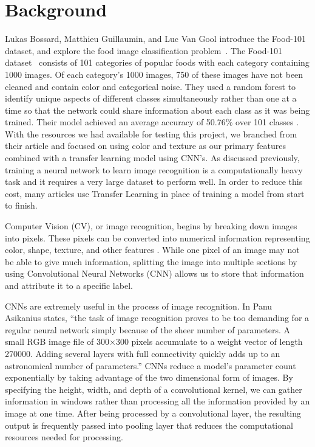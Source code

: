 \documentclass[conference]{IEEEtran}
\begin{document}
\section{Background}

Lukas Bossard, Matthieu Guillaumin, and Luc Van Gool introduce the Food-101 dataset, and explore the food image classification problem~\cite{mainRef}. The Food-101 dataset~\cite{dataset} consists of 101 categories of popular foods with each category containing 1000 images. Of each category's 1000 images, 750 of these images have not been cleaned and contain color and categorical noise. They used a random forest to identify unique aspects of different classes simultaneously rather than one at a time so that the network could share information about each class as it was being trained. Their model achieved an average accuracy of 50.76\% over 101 classes \cite{mainRef}. With the resources we had available for testing this project, we branched from their article and focused on using color and texture as our primary features combined with a transfer learning model using CNN's. As discussed previously, training a neural network to learn image recognition is a computationally heavy task and it requires a very large dataset to perform well. In order to reduce this cost, many articles use Transfer Learning in place of training a model from start to finish. 

Computer Vision (CV), or image recognition, begins by breaking down images into pixels. These pixels can be converted into numerical information representing color, shape, texture, and other features \cite{Tlearning}. While one pixel of an image may not be able to give much information, splitting the image into multiple sections by using Convolutional Neural Networks (CNN) allows us to store that information and attribute it to a specific label. 

 CNNs are extremely useful in the process of image recognition. In \cite{CNN} Panu Asikanius states, ``the task of image recognition proves to be too demanding for a regular neural network simply because of the sheer number of parameters. A small RGB image file of 300×300 pixels accumulate to a weight vector of length 270000. Adding several layers with full connectivity quickly adds up to an astronomical number of parameters.'' CNNs reduce a model's parameter count exponentially by taking advantage of the two dimensional form of images. By specifying the height, width, and depth of a convolutional kernel, we can gather information in windows rather than processing all the information provided by an image at one time. After being processed by a convolutional layer, the resulting output is frequently passed into pooling layer that reduces the computational resources needed for processing. 
\end{document}
